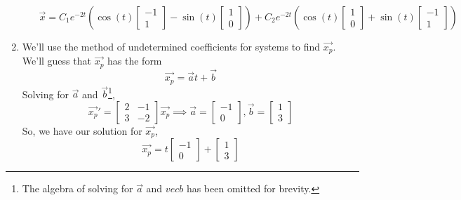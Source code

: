 \begin{enumerate}[label=\arabic*.]
\begin{enumerate}[label=(\alph*)]
					\begin{equation*}
						\vec{x} = C_1e^{-2t}\left(\cos{(t)}\begin{bmatrix}
							-1 \\
							1
						\end{bmatrix} - \sin{(t)}\begin{bmatrix}
							1 \\
							0
						\end{bmatrix}\right) + C_2e^{-2t}\left(\cos{(t)}\begin{bmatrix}
							1 \\
							0
						\end{bmatrix} + \sin{(t)}\begin{bmatrix}
							-1 \\
							1
						\end{bmatrix}
						\right)
					\end{equation*}
			\end{enumerate}
		\item
			We'll use the method of undetermined coefficients for systems to find $\vec{x_p}$. We'll guess that $\vec{x_p}$ has the form
			\begin{equation*}
				\vec{x_p} = \vec{a}t + \vec{b}
			\end{equation*}
			Solving for $\vec{a}$ and $\vec{b}$\footnote{The algebra of solving for $\vec{a}$ and $vec{b}$ has been omitted for brevity.},
			\begin{equation*}
				\vec{x_p}' = \begin{bmatrix}
					2 & -1 \\
					3 & -2
				\end{bmatrix}\vec{x_p} \implies \vec{a} = \begin{bmatrix}
					-1 \\
					0
				\end{bmatrix}, \vec{b} = \begin{bmatrix}
					1 \\
					3
				\end{bmatrix}
			\end{equation*}
			So, we have our solution for $\vec{x_p}$,
			\begin{equation*}
				\vec{x_p} = t\begin{bmatrix}
					-1 \\
					0
				\end{bmatrix} + \begin{bmatrix}
					1 \\
					3
				\end{bmatrix}

\end{equation*}
\end{enumerate}
